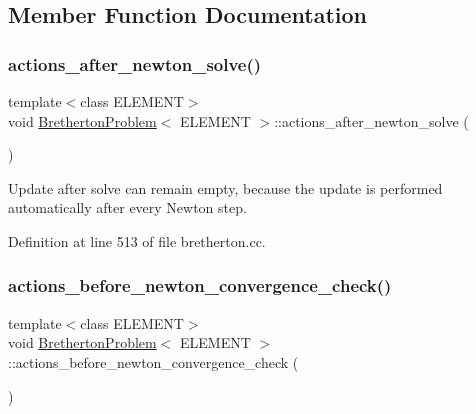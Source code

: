 \subsection{Member Function Documentation}
\mbox{\label{classBrethertonProblem_a2e84e3ce784b0f0de5eeefe1175d48ff}} 
\subsubsection{\texorpdfstring{actions\+\_\+after\+\_\+newton\+\_\+solve()}{actions\_after\_newton\_solve()}}
{\footnotesize\ttfamily template$<$class E\+L\+E\+M\+E\+NT$>$ \\
void \hyperlink{classBrethertonProblem}{Bretherton\+Problem}$<$ E\+L\+E\+M\+E\+NT $>$\+::actions\+\_\+after\+\_\+newton\+\_\+solve (\begin{DoxyParamCaption}{ }\end{DoxyParamCaption})\hspace{0.3cm}{\ttfamily [inline]}}



Update after solve can remain empty, because the update is performed automatically after every Newton step. 



Definition at line 513 of file bretherton.\+cc.

\mbox{\label{classBrethertonProblem_a6a3e76e4900715d8c2fd15d0e350d724}} 
\subsubsection{\texorpdfstring{actions\+\_\+before\+\_\+newton\+\_\+convergence\+\_\+check()}{actions\_before\_newton\_convergence\_check()}}
{\footnotesize\ttfamily template$<$class E\+L\+E\+M\+E\+NT$>$ \\
void \hyperlink{classBrethertonProblem}{Bretherton\+Problem}$<$ E\+L\+E\+M\+E\+NT $>$\+::actions\+\_\+before\+\_\+newton\+\_\+convergence\+\_\+check (\begin{DoxyParamCaption}{ }\end{DoxyParamCaption})\hspace{0.3cm}{\ttfamily [inline]}}



